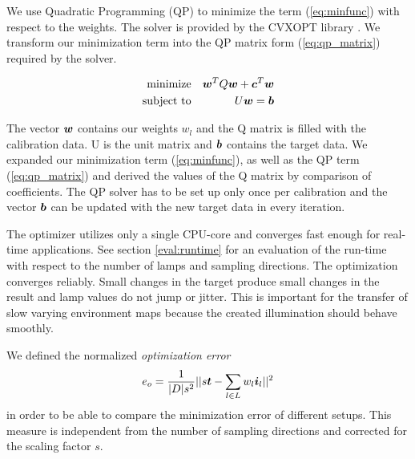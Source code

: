    We use Quadratic Programming (QP) to minimize the term (\ref{eq:minfunc}) with respect to the weights. The solver is provided by the CVXOPT library \cite{CVXOPT}.
   We transform our minimization term into the QP matrix form (\ref{eq:qp_matrix}) required by the solver. 

      \begin{eqnarray}
        \label{eq:qp_matrix}
         \mbox{minimize} && \boldsymbol{w}^TQ\boldsymbol{w} + \boldsymbol{c}^T\boldsymbol{w} \nonumber \\
         \mbox{subject to} && U\boldsymbol{w}=\boldsymbol{b}
      \end{eqnarray}
   
    The vector $\boldsymbol{w}$ contains our weights $w_l$ and the Q matrix is filled with the calibration data.
    U is the unit matrix and $\boldsymbol{b}$ contains the target data. 
    We expanded our minimization term (\ref{eq:minfunc}), as well as the QP term (\ref{eq:qp_matrix}) and derived the values of the Q matrix by comparison of coefficients.  
    The QP solver has to be set up only once per calibration and the vector $\boldsymbol{b}$ can be updated with the new target data in every iteration.
    
    The optimizer utilizes only a single CPU-core and converges fast enough for real-time applications. 
    See section \ref{eval:runtime} for an evaluation of the run-time with respect to the number of lamps and sampling directions.
    The optimization converges reliably. Small changes in the target produce small changes in the result and lamp values do not jump or jitter.
    This is important for the transfer of slow varying environment maps because the created illumination should behave smoothly. 
    
    We defined the normalized \emph{optimization error} 
    \begin{equation}
     \label{eq:opterror}
      e_o = \frac{1}{|D|s^2} ||s\boldsymbol{t} - \sum_{l \in L} w_l \boldsymbol{i}_l||^2
    \end{equation}
    in order to be able to compare the minimization error of different setups. 
    This measure is independent from the number of sampling directions and corrected for the scaling factor $s$.

